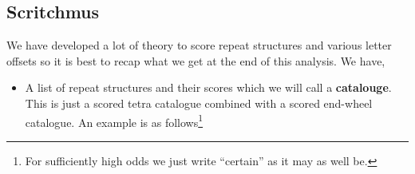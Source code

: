   \subsection{Scritchmus}
  We have developed a lot of theory to score repeat structures and
  various letter offsets so it is best to recap what we get at the
  end of this analysis. We have,
  \begin{itemize}
    \item A list of repeat structures and their scores which we will
      call a {\bf{catalouge}}. This is just a scored tetra catalogue
      combined with a scored end-wheel catalogue. An example is as
      follows\footnote{For sufficiently high odds we just write
      ``certain'' as it may as well be.}
      \begin{figure}[H]


\end{figure}
\end{itemize}
